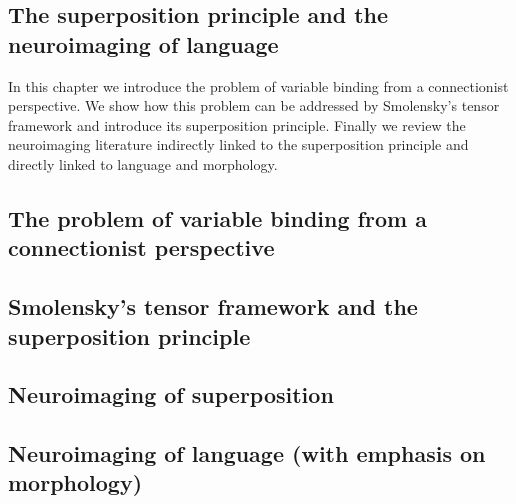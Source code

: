 \begin{fullwidth}
\chapter{\label{ch:super_intro}
The superposition principle and the neuroimaging of language}
\end{fullwidth}

\begin{chabstract}

In this chapter we introduce the problem of variable binding from a connectionist perspective. We show how this problem can be addressed by Smolensky's tensor framework and introduce its superposition principle. Finally we review the neuroimaging literature indirectly linked to the superposition principle and directly linked to language and morphology.

\end{chabstract}


\section{The problem of variable binding from a connectionist perspective}


\section{Smolensky's tensor framework and the superposition principle}


\section{Neuroimaging of superposition}

\section{Neuroimaging of language (with emphasis on morphology)}
